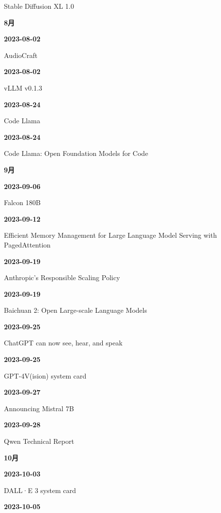 {\raggedright Stable Diffusion XL 1.0\par}
\smallskip
\medskip
\noindent\textbf{8月}\par
\smallskip
\noindent\textbf{2023-08-02}\par
{\raggedright AudioCraft\par}
\smallskip
\noindent\textbf{2023-08-02}\par
{\raggedright vLLM v0.1.3\par}
\smallskip
\noindent\textbf{2023-08-24}\par
{\raggedright Code Llama\par}
\smallskip
\noindent\textbf{2023-08-24}\par
{\raggedright Code Llama: Open Foundation Models for Code\par}
\smallskip
\medskip
\noindent\textbf{9月}\par
\smallskip
\noindent\textbf{2023-09-06}\par
{\raggedright Falcon 180B\par}
\smallskip
\noindent\textbf{2023-09-12}\par
{\raggedright Efficient Memory Management for Large Language Model Serving with PagedAttention\par}
\smallskip
\noindent\textbf{2023-09-19}\par
{\raggedright Anthropic's Responsible Scaling Policy\par}
\smallskip
\noindent\textbf{2023-09-19}\par
{\raggedright Baichuan 2: Open Large-scale Language Models\par}
\smallskip
\noindent\textbf{2023-09-25}\par
{\raggedright ChatGPT can now see, hear, and speak\par}
\smallskip
\noindent\textbf{2023-09-25}\par
{\raggedright GPT-4V(ision) system card\par}
\smallskip
\noindent\textbf{2023-09-27}\par
{\raggedright Announcing Mistral 7B\par}
\smallskip
\noindent\textbf{2023-09-28}\par
{\raggedright Qwen Technical Report\par}
\smallskip
\medskip
\noindent\textbf{10月}\par
\smallskip
\noindent\textbf{2023-10-03}\par
{\raggedright DALL·E 3 system card\par}
\smallskip
\noindent\textbf{2023-10-05}\par
